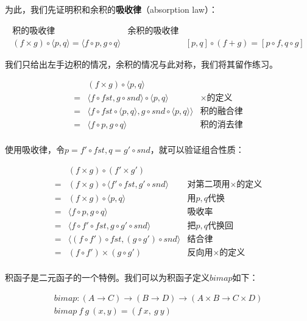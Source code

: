\documentclass{article}
\begin{document}
为此，我们先证明积和余积的\textbf{吸收律}（absorption law）：

\[
\begin{array}{ccc}
  \text{积的吸收律} & \text{余积的吸收律} \\
  (f \times g) \circ \langle p, q \rangle = \langle f \circ p, g \circ q \rangle
  & \quad \quad &
  [p, q] \circ (f + g) = [p \circ f, q \circ g]
\end{array}
\]

我们只给出左手边积的情况，余积的情况与此对称，我们将其留作练习。

\[
\begin{array}{cll}
   & (f \times g) \circ \langle p, q \rangle & \\
 = & \langle f \circ fst, g \circ snd \rangle \circ \langle p, q \rangle & \text{$\times$的定义} \\
 = & \langle f \circ fst \circ \langle p, q \rangle, g \circ snd \circ \langle p, q \rangle \rangle & \text{积的融合律} \\
 = & \langle f \circ p, g \circ q \rangle & \text{积的消去律} \\
\end{array}
\]

使用吸收律，令$p = f' \circ fst, q = g' \circ snd$，就可以验证组合性质：

\[
\begin{array}{cll}
  & (f \times g) \circ (f' \times g') & \\
= & (f \times g) \circ \langle f' \circ fst, g' \circ snd \rangle & \text{对第二项用$\times$的定义} \\
= & (f \times g) \circ \langle p, q \rangle & \text{用$p, q$代换} \\
= & \langle f \circ p, g \circ q \rangle & \text{吸收率} \\
= & \langle f \circ f' \circ fst, g \circ g' \circ snd \rangle & \text{把$p, q$代换回} \\
= & \langle (f \circ f') \circ fst, (g \circ g') \circ snd \rangle & \text{结合律} \\
= & (f \circ f') \times (g \circ g') & \text{反向用$\times$的定义} \\
\end{array}
\]

积函子是二元函子的一个特例。我们可以为积函子定义$bimap$如下：

\[
\begin{array}{l}
bimap : (A \to C) \to (B \to D) \to (A \times B \to C \times D) \\
bimap\ f\ g\ (x, y) = (f\ x,\ g\ y)
\end{array}
\]
\end{document}
